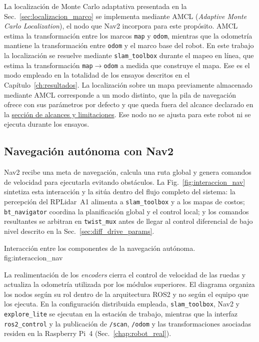 La localización de Monte Carlo adaptativa presentada en la
Sec.~\ref{sec:localizacion_marco} se implementa mediante AMCL
(\textit{Adaptive Monte Carlo Localization}), el nodo que Nav2 incorpora para
este propósito. AMCL estima la transformación entre los marcos \texttt{map} y
\texttt{odom}, mientras que la odometría mantiene la transformación entre
\texttt{odom} y el marco base del robot.
En este trabajo la localización se resuelve mediante \texttt{slam\_toolbox}
durante el mapeo en línea, que estima la transformación
\texttt{map}$\rightarrow$\texttt{odom} a medida que construye el mapa. Ese es
el modo empleado en la totalidad de los ensayos descritos en el
Capítulo~\ref{ch:resultados}. La localización sobre un mapa previamente
almacenado mediante AMCL corresponde a un modo distinto, que la pila de
navegación ofrece con sus parámetros por defecto y que queda fuera del alcance
declarado en la \hyperref[sec:alcances]{sección de alcances y limitaciones}.
Ese nodo no se ajusta para este robot ni se ejecuta durante los ensayos.

\subsection{Navegación autónoma con Nav2}
\label{sec:nav2_ch9}

Nav2 recibe una meta de navegación, calcula una ruta global y genera comandos
de velocidad para ejecutarla evitando obstáculos. La
Fig.~\ref{fig:interaccion_nav} sintetiza esta interacción y la sitúa dentro
del flujo completo del sistema: la percepción del RPLidar~A1 alimenta a
\texttt{slam\_toolbox} y a los mapas de costos; \texttt{bt\_navigator}
coordina la planificación global y el control local; y los comandos
resultantes se arbitran en \texttt{twist\_mux} antes de llegar al control
diferencial de bajo nivel descrito en la Sec.~\ref{sec:diff_drive_params}.

{Interacción entre los componentes de la navegación autónoma.}
{fig:interaccion_nav}

La realimentación de los \textit{encoders} cierra el control de velocidad de las ruedas
y actualiza la odometría utilizada por los módulos superiores.
El diagrama organiza los nodos según su rol dentro de la arquitectura
\gls{ROS2} y no según el equipo que los ejecuta. En la configuración
distribuida empleada, \texttt{slam\_toolbox}, Nav2 y \texttt{explore\_lite}
se ejecutan en la estación de trabajo, mientras que la interfaz
\texttt{ros2\_control} y la publicación de \texttt{/scan}, \texttt{/odom} y
las transformaciones asociadas residen en la Raspberry Pi~4
(Sec.~\ref{chap:robot_real}).

